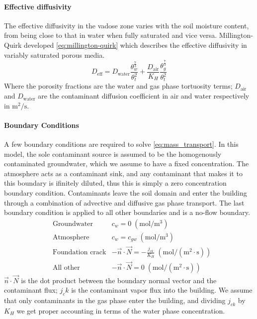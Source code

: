 \paragraph{Effective diffusivity}

The effective diffusivity in the vadose zone varies with the soil moisture content, from being close to that in water when fully saturated and vice versa.
Millington-Quirk developed \eqref{eq:millington-quirk} which describes the effective diffusivity in variably saturated porous media.
\begin{equation}\label{eq:millington-quirk}
  D_\mathrm{eff} = D_\mathrm{water} \frac{\theta_w^\frac{7}{3}}{\theta_t^2} + \frac{D_\mathrm{air}}{K_H} \frac{\theta_g^\frac{7}{3}}{\theta_t^2}
\end{equation}
Where the porosity fractions are the water and gas phase tortuosity terms;
$D_\mathrm{air}$ and $D_\mathrm{water}$ are the contaminant diffusion coefficient in air and water respectively in $\mathrm{m^2/s}$.\par

\paragraph{Boundary Conditions}\label{par:mass_transport_bc}

A few boundary conditions are required to solve \eqref{eq:mass_transport}.
In this model, the sole contaminant source is assumed to be the homogenously contaminated groundwater, which we assume to have a fixed concentration.
The atmosphere acts as a contaminant sink, and any contaminant that makes it to this boundary is ifinitely diluted, thus this is simply a zero concentration boundary condition.
Contaminants leave the soil domain and enter the building through a combination of advective and diffusive gas phase transport.
The last boundary condition is applied to all other boundaries and is a no-flow boundary.
\begin{align}
  &\text{Groundwater} & c_w = 0 \; \mathrm{(mol/m^3)} \\
  &\text{Atmosphere} & c_w = c_{gw} \; \mathrm{(mol/m^3)} \\
  &\text{Foundation crack} & -\vec{n} \cdot \vec{N} = - \frac{j_{ck}}{K_H} \; \mathrm{(mol/(m^2 \cdot s))}\\
  &\text{All other} & -\vec{n} \cdot \vec{N} = 0 \; \mathrm{(mol/(m^2 \cdot s))}
\end{align}
$\vec{n} \cdot \vec{N}$ is the dot product between the boundary normal vector and the contaminant flux;
$j_ck$ is the contaminant vapor flux into the building.
We assume that only contaminants in the gas phase enter the building, and dividing $j_{ck}$ by $K_H$ we get proper accounting in terms of the water phase concentration.\par

